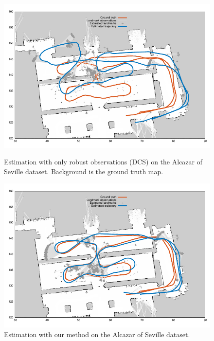\begin{figure}[ht]
\centering
\begin{minipage}[b]{0.48\textwidth}
  \includegraphics[width=\textwidth]{fig/alcazar-robust}
  \caption{Estimation with only robust observations (DCS) on the Alcazar of Seville dataset. Background is the ground truth map.}
  \label{fig:alcazar-robust}
\end{minipage}
\quad
\begin{minipage}[b]{0.48\textwidth}
  \includegraphics[width=\textwidth]{fig/alcazar-movable-robust}
  \caption{Estimation with our method on the Alcazar of Seville dataset.}
  \label{fig:alcazar-movable-robust}
\end{minipage}
\end{figure}

